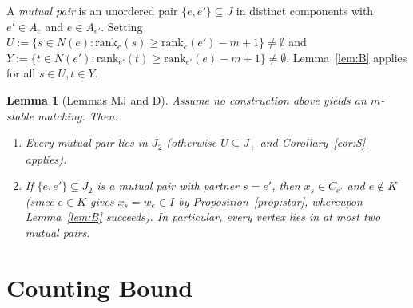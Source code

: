 \documentclass[11pt]{article}
\newtheorem{lemma}[theorem]{Lemma}
\begin{document}
A \emph{mutual pair} is an unordered pair $\{e, e'\} \subseteq J$ in distinct components with $e' \in A_e$ and $e \in A_{e'}$. Setting $U := \{s \in N(e) : \mathrm{rank}_e(s) \ge \mathrm{rank}_e(e') - m + 1\} \neq \emptyset$ and $Y := \{t \in N(e') : \mathrm{rank}_{e'}(t) \ge \mathrm{rank}_{e'}(e) - m + 1\} \neq \emptyset$, Lemma~\ref{lem:B} applies for all $s \in U, t \in Y$.

\begin{lemma}[Lemmas MJ and D]\label{lem:MD}
Assume no construction above yields an $m$-stable matching. Then:
\begin{enumerate}
  \item Every mutual pair lies in $J_2$ (otherwise $U \subseteq J_+$ and Corollary~\ref{cor:S} applies).
  \item If $\{e, e'\} \subseteq J_2$ is a mutual pair with partner $s = e'$, then $x_s \in C_{e'}$ and $e \notin K$ (since $e \in K$ gives $x_s = w_e \in I$ by Proposition~\ref{prop:star}, whereupon Lemma~\ref{lem:B} succeeds). In particular, every vertex lies in at most two mutual pairs.
\end{enumerate}
\end{lemma}

\section{Counting Bound}\label{sec:counting}
\end{document}
